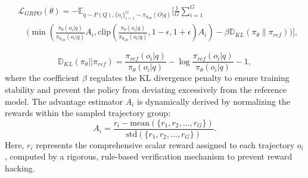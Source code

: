 \documentclass{llmxive}
\begin{document}

\begin{equation}
\begin{aligned}
    &\mathcal{L}_{GRPO}(\theta) = -\mathbb{E}_{q \sim P(Q), \{o_i\}_{i=1}^{G} \sim \pi_{\theta_{old}}(O|q)} \Bigg[ \frac{1}{G} \sum_{i=1}^G \\
    &\quad \Bigg( \min\left( \frac{\pi_\theta(o_i|q)}{\pi_{\theta_{old}}(o_i|q)} A_i, \text{clip}\left(\frac{\pi_\theta(o_i|q)}{\pi_{\theta_{old}}(o_i|q)}, 1-\epsilon, 1+\epsilon\right) A_i \right) - \beta \mathbb{D}_{KL}(\pi_\theta \| \pi_{ref}) \Bigg) \Bigg],
\end{aligned}
\end{equation}


\begin{equation}
\mathbb{D}_{KL}(\pi_\theta||\pi_{ref}) = \frac{\pi_{ref}(o_i|q)}{\pi_\theta(o_i|q)} - \log \frac{\pi_{ref}(o_i|q)}{\pi_\theta(o_i|q)} - 1, 
\end{equation}
where the coefficient $ \beta $ regulates the KL divergence penalty to ensure training stability and prevent the policy from deviating excessively from the reference model. The advantage estimator $ A_{i} $ is dynamically derived by normalizing the rewards within the sampled trajectory group:  
\begin{equation}
A_{i} = \frac{r_i - \text{mean}(\{r_1, r_2, \dots, r_G\})}{\text{std}(\{r_1, r_2, \dots, r_G\})}.
\end{equation}
Here, $ r_i $ represents the comprehensive scalar reward assigned to each trajectory $ o_i $, computed by a rigorous, rule-based verification mechanism to prevent reward hacking.
\end{document}
